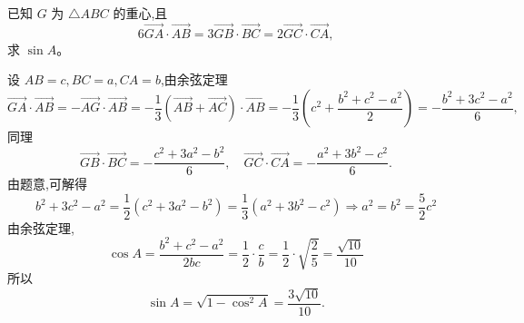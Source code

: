 \begin{questions}
    \question 已知 $G$ 为 $\triangle ABC$ 的重心,且 
    \[
    6\overrightarrow{GA}\cdot\overrightarrow{AB} = 3\overrightarrow{GB}\cdot\overrightarrow{BC} = 2\overrightarrow{GC}\cdot\overrightarrow{CA},
    \] 
    求 $\sin A$。
    \begin{solution}
        设 $AB=c,BC=a,CA=b$,由余弦定理
        \[
        \overrightarrow{GA}\cdot \overrightarrow{AB}=-\overrightarrow{AG}\cdot \overrightarrow{AB}
        =-\frac{1}{3}(\overrightarrow{AB}+\overrightarrow{AC})\cdot \overrightarrow{AB}
        =-\frac{1}{3} \left(c^2+\frac{b^2+c^2-a^2}{2}\right)
        =-\frac{b^2+3c^2-a^2}{6},
        \]
        同理
        \[
        \overrightarrow{GB}\cdot\overrightarrow{BC}
        =-\frac{c^2+3a^2-b^2}{6},\quad
        \overrightarrow{GC}\cdot\overrightarrow{CA}
        =-\frac{a^2+3b^2-c^2}{6}.
        \]
        由题意,可解得
        \[
        b^2+3c^2-a^2=\frac{1}{2}\left(c^2+3a^2-b^2\right)
        =\frac{1}{3}\left(a^2+3b^2-c^2\right) \Rightarrow a^2=b^2=\frac{5}{2}c^2
        \]
        由余弦定理,
        \[
        \cos A=\frac{b^2+c^2-a^2}{2bc}=\frac{1}{2}\cdot\frac{c}{b}
        =\frac{1}{2}\cdot\sqrt{\frac{2}{5}}=\frac{\sqrt{10}}{10}
        \]
        所以
        \[
        \sin A=\sqrt{1-\cos^2 A}=\frac{3\sqrt{10}}{10}.
        \]
    \end{solution}


\end{questions}
